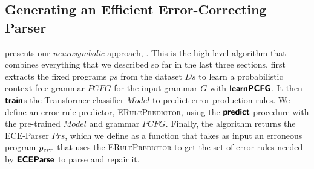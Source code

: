 \subsection{Generating an Efficient Error-Correcting Parser}
\label{sec:whole-system:building-ecp}



 presents our \emph{neurosymbolic} approach, \toolname.
This is the high-level algorithm that combines everything that we described so
far in the last three sections. \toolname first extracts the fixed programs $ps$
from the dataset $Ds$ to learn a probabilistic context-free grammar $PCFG$ for
the input grammar $G$ with $\bm{\mathsf{learnPCFG}}$. It then $\bm{\mathsf{train}}$s the Transformer
classifier $Model$ to predict error production rules. We define an error rule
predictor, \textsc{ERulePredictor}, using the $\bm{\mathsf{predict}}$ procedure with the
pre-trained $Model$ and grammar $PCFG$. Finally, the algorithm returns the
ECE-Parser $Prs$, which we define as a function that takes as input an erroneous
program $p_{err}$ that uses the \textsc{ERulePredictor} to get the set of error
rules needed by $\bm{\mathsf{ECEParse}}$ to parse and repair it.
